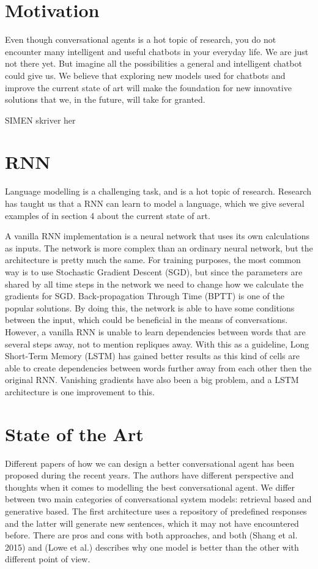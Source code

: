 \documentclass{article} %
\begin{document}
\section{Motivation}
Even though conversational agents is a hot topic of research, you do not encounter many intelligent and useful chatbots in your everyday life. We are just not there yet. But imagine all the possibilities a general and intelligent chatbot could give us. We believe that exploring new models used for chatbots and improve the current state of art will make the foundation for new innovative solutions that we, in the future, will take for granted. 

SIMEN skriver her


\section{RNN}
Language modelling is a challenging task, and is a hot topic of research. Research has taught us that a RNN can learn to model a language, which we give several examples of in section 4 about the current state of art. 

A vanilla RNN implementation is a neural network that uses its own calculations as inputs. The network is more complex than an ordinary neural network, but the architecture is pretty much the same. For training purposes, the most common way is to use Stochastic Gradient Descent (SGD), but since the parameters are shared by all time steps in the network we need to change how we calculate the gradients for SGD. Back-propagation Through Time (BPTT) is one of the popular solutions. By doing this, the network is able to have some conditions between the input, which could be beneficial in the means of conversations. However, a vanilla RNN is unable to learn dependencies between words that are several steps away, not to mention repliques away. With this as a guideline, Long Short-Term Memory (LSTM) has gained better results as this kind of cells are able to create dependencies between words further away from each other then the original RNN. Vanishing gradients have also been a big problem, and a LSTM architecture is one improvement to this.

\section{State of the Art}
Different papers of how we can design a better conversational agent has been proposed during the recent years. The authors have different perspective and thoughts when it comes to modelling the best conversational agent. We differ between two main categories of conversational system models: retrieval based and generative based. The first architecture uses a repository of predefined responses and the latter will generate new sentences, which it may not have encountered before. There are pros and cons with both approaches, and both (Shang et al. 2015) and (Lowe et al.) describes why one model is better than the other with different point of view. 
\end{document}
